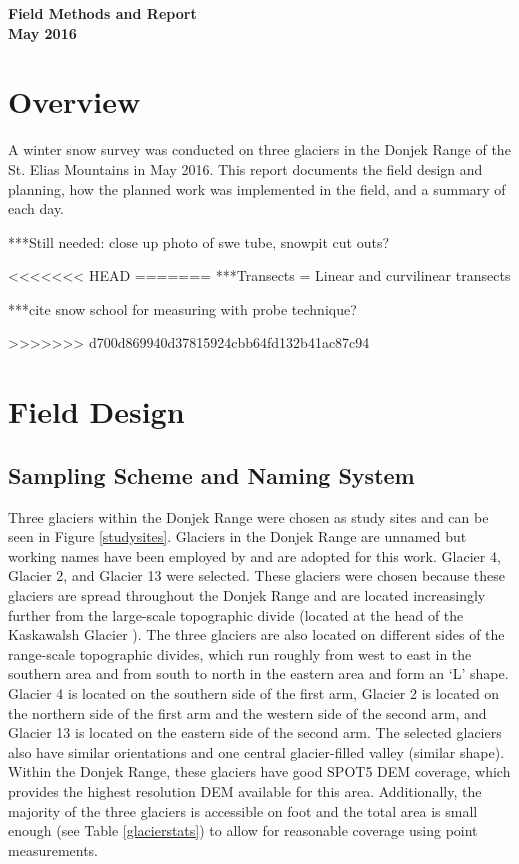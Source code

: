 \documentclass[12pt]{article}
\begin{document}

\begin{center}
\Large \textbf{Field Methods and Report \\ May 2016}
\end{center}


\section*{Overview}

A winter snow survey was conducted on three glaciers in the Donjek Range of the St. Elias Mountains in May 2016. This report documents the field design and planning, how the planned work was implemented in the field, and a summary of each day. 

***Still needed: close up photo of swe tube, snowpit cut outs?

<<<<<<< HEAD
=======
***Transects = Linear and curvilinear transects

***cite snow school for measuring with probe technique?

>>>>>>> d700d869940d37815924cbb64fd132b41ac87c94
\tableofcontents
\pagebreak

\section{Field Design}

\subsection{Sampling Scheme and Naming System}

Three glaciers within the Donjek Range were chosen as study sites and can be seen in Figure \ref{studysites}. Glaciers in the Donjek Range are unnamed but working names have been employed by \cite{Crompton2016} and are adopted for this work. Glacier 4, Glacier 2, and Glacier 13 were selected. These glaciers were chosen because these glaciers are spread throughout the Donjek Range and are located increasingly further from the large-scale topographic divide (located at the head of the Kaskawalsh Glacier \citep{Taylor1969}). The three glaciers are also located on different sides of the range-scale topographic divides, which run roughly from west to east in the southern area and from south to north in the eastern area and form an `L' shape. Glacier 4 is located on the southern side of the first arm, Glacier 2 is located on the northern side of the first arm and the western side of the second arm, and Glacier 13 is located on the eastern side of the second arm. The selected glaciers also have similar orientations and one central glacier-filled valley (similar shape). Within the Donjek Range, these glaciers have good SPOT5 DEM coverage, which provides the highest resolution DEM available for this area. Additionally, the majority of the three glaciers is accessible on foot and the total area is small enough (see Table \ref{glacierstats}) to allow for reasonable coverage using point measurements.
\end{document}
